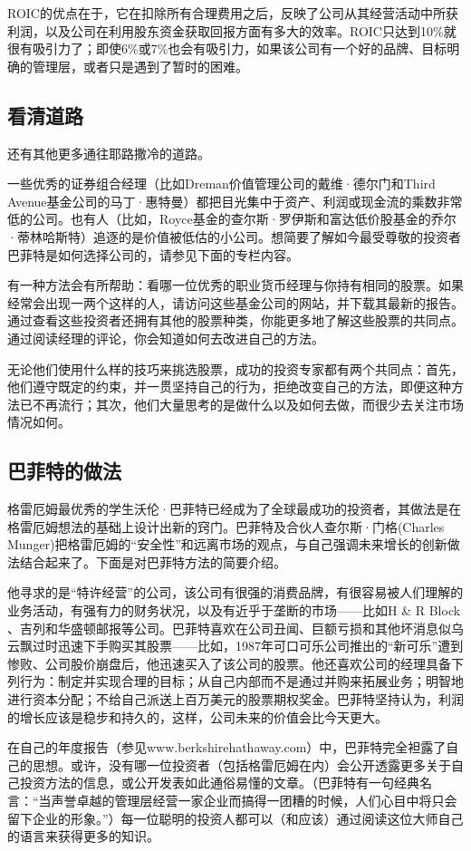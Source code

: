 \documentclass[12pt,oneside]{book}
\begin{document}
ROIC的优点在于，它在扣除所有合理费用之后，反映了公司从其经营活动中所获利润，以及公司在利用股东资金获取回报方面有多大的效率。ROIC只达到10\%就很有吸引力了；即使6\%或7\%也会有吸引力，如果该公司有一个好的品牌、目标明确的管理层，或者只是遇到了暂时的困难。

\subsection{看清道路}
还有其他更多通往耶路撒冷的道路。

一些优秀的证券组合经理（比如Dreman价值管理公司的戴维·德尔门和Third Avenue基金公司的马丁·惠特曼）都把目光集中于资产、利润或现金流的乘数非常低的公司。也有人（比如，Royce基金的查尔斯·罗伊斯和富达低价股基金的乔尔·蒂林哈斯特）追逐的是价值被低估的小公司。想简要了解如今最受尊敬的投资者巴菲特是如何选择公司的，请参见下面的专栏内容。

有一种方法会有所帮助：看哪一位优秀的职业货币经理与你持有相同的股票。如果经常会出现一两个这样的人，请访问这些基金公司的网站，并下载其最新的报告。通过查看这些投资者还拥有其他的股票种类，你能更多地了解这些股票的共同点。通过阅读经理的评论，你会知道如何去改进自己的方法。

无论他们使用什么样的技巧来挑选股票，成功的投资专家都有两个共同点：首先，他们遵守既定的约束，并一贯坚持自己的行为，拒绝改变自己的方法，即便这种方法已不再流行；其次，他们大量思考的是做什么以及如何去做，而很少去关注市场情况如何。


\subsection{巴菲特的做法}
格雷厄姆最优秀的学生沃伦·巴菲特已经成为了全球最成功的投资者，其做法是在格雷厄姆想法的基础上设计出新的窍门。巴菲特及合伙人查尔斯·门格(Charles Munger)把格雷厄姆的“安全性”和远离市场的观点，与自己强调未来增长的创新做法结合起来了。下面是对巴菲特方法的简要介绍。

他寻求的是“特许经营”的公司，该公司有很强的消费品牌，有很容易被人们理解的业务活动，有强有力的财务状况，以及有近乎于垄断的市场——比如H \& R Block 、吉列和华盛顿邮报等公司。巴菲特喜欢在公司丑闻、巨额亏损和其他坏消息似乌云飘过时迅速下手购买其股票——比如，1987年可口可乐公司推出的“新可乐”遭到惨败、公司股价崩盘后，他迅速买入了该公司的股票。他还喜欢公司的经理具备下列行为：制定并实现合理的目标；从自己内部而不是通过并购来拓展业务；明智地进行资本分配；不给自己派送上百万美元的股票期权奖金。巴菲特坚持认为，利润的增长应该是稳步和持久的，这样，公司未来的价值会比今天更大。

在自己的年度报告（参见www.berkshirehathaway.com）中，巴菲特完全袒露了自己的思想。或许，没有哪一位投资者（包括格雷厄姆在内）会公开透露更多关于自己投资方法的信息，或公开发表如此通俗易懂的文章。（巴菲特有一句经典名言：“当声誉卓越的管理层经营一家企业而搞得一团糟的时候，人们心目中将只会留下企业的形象。”）每一位聪明的投资人都可以（和应该）通过阅读这位大师自己的语言来获得更多的知识。
\end{document}
